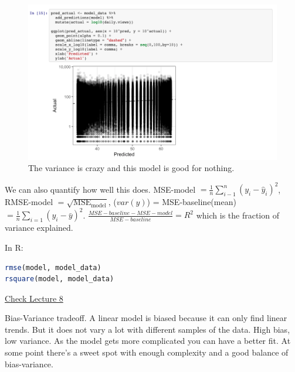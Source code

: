 

\begin{figure}[ht]
  \begin{center}
    \includegraphics[width=1.0\textwidth]{figures/ScreenShot.png}
    \caption{
      The variance is crazy and this model is good for nothing.}
    \label{fig:example_figure}
  \end{center}
\end{figure}


We can also quantify how well this does. 
MSE-{model} $ = \frac{1}{n} \sum_{i-1}^n (y_i - \hat{y}_i)^2$, RMSE-model $= \sqrt{\text{MSE}_{\text{model}}}$, ($var(y)$) = MSE-baseline(mean) $= \frac{1}{n}\sum_{i=1}(y_i - \bar{y})^2$. $\frac{MSE-baseline - MSE-model}{MSE - baseline} = R^2$ which is the fraction of variance explained. 

In R:
\begin{lstlisting}[language=R]
rmse(model, model_data)
rsquare(model, model_data)
\end{lstlisting}

\href{https://github.com/jhofman/msd2019/blob/master/lectures/lecture_8/lecture_8.pdf}{Check Lecture 8}

Bias-Variance tradeoff. A linear model is biased because it can only find linear trends. But it does not vary a lot with different samples of the data. High bias, low variance.  As the model gets more complicated you can have a better fit. At some point there's a sweet spot with enough complexity and a good balance of bias-variance. 

